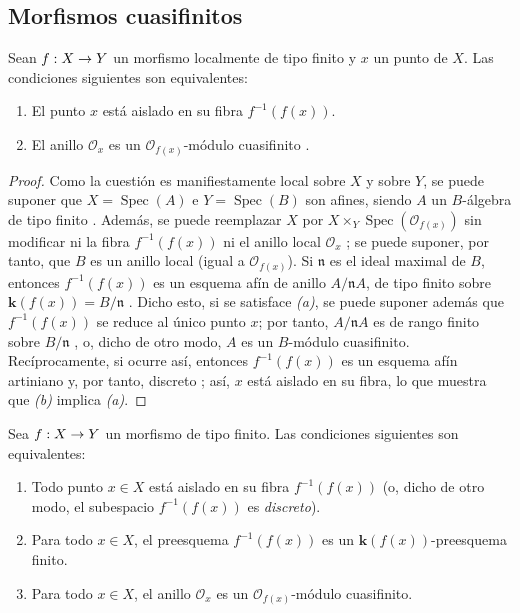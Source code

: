 \documentclass[oneside,10pt]{amsart}
\makeatletter
\newcommand{\ega@arrow}[2]{\mathchoice{#1}{#2}{#2}{#2}}
\renewcommand{\to}{\ega@arrow{\longrightarrow}{\rightarrow}}
\newcommand{\oldpage}[2][]{\marginnote{\normalfont\footnotesize\textbf{#1}~|~#2}\ignorespaces}
\let\EGAOriginalLabel\label
\renewcommand{\label}[1]{\phantomsection\EGAOriginalLabel{#1}}
\makeatother
\begin{document}
\subsection{Morfismos cuasifinitos}
\label{subsection:II.6.2-fr}

\begin{proposition}[6.2.1]
\label{II.6.2.1-fr}
Sean $f:X\to Y$ un morfismo localmente de tipo finito y $x$ un punto de $X$.
Las condiciones siguientes son equivalentes:
\oldpage[II]{115}
\begin{enumerate}
  \item[{\rm(a)}] El punto $x$ está aislado en su fibra $f^{-1}(f(x))$.
  \item[{\rm(b)}] El anillo $\mathcal{O}_x$ es un $\mathcal{O}_{f(x)}$-módulo cuasifinito \textup{}.
\end{enumerate}
\end{proposition}

\begin{proof}
Como la cuestión es manifiestamente local sobre $X$ y sobre $Y$, se puede suponer que $X=\operatorname{Spec}(A)$ e $Y=\operatorname{Spec}(B)$ son afines, siendo $A$ un $B$-álgebra de tipo finito .
Además, se puede reemplazar $X$ por $X\times_Y\operatorname{Spec}(\mathcal{O}_{f(x)})$ sin modificar ni la fibra $f^{-1}(f(x))$ ni el anillo local $\mathcal{O}_x$ ;
se puede suponer, por tanto, que $B$ es un anillo local (igual a $\mathcal{O}_{f(x)}$).
Si $\mathfrak{n}$ es el ideal maximal de $B$, entonces $f^{-1}(f(x))$ es un esquema afín de anillo $A/\mathfrak{n}A$, de tipo finito sobre $\boldsymbol{k}(f(x))=B/\mathfrak{n}$ .
Dicho esto, si se satisface \emph{(a)}, se puede suponer además que $f^{-1}(f(x))$ se reduce al único punto $x$;
por tanto, $A/\mathfrak{n}A$ es de rango finito sobre $B/\mathfrak{n}$ , o, dicho de otro modo, $A$ es un $B$-módulo cuasifinito.
Recíprocamente, si ocurre así, entonces $f^{-1}(f(x))$ es un esquema afín artiniano y, por tanto, discreto ;
así, $x$ está aislado en su fibra, lo que muestra que \emph{(b)} implica \emph{(a)}.
\end{proof}

\begin{corollary}[6.2.2]
\label{II.6.2.2-fr}
Sea $f:X\to Y$ un morfismo de tipo finito.
Las condiciones siguientes son equivalentes:
\begin{enumerate}
  \item[{\rm(a)}] Todo punto $x\in X$ está aislado en su fibra $f^{-1}(f(x))$ \textup{(o, dicho de otro modo, el subespacio $f^{-1}(f(x))$ es \emph{discreto})}.
  \item[{\rm(b)}] Para todo $x\in X$, el preesquema $f^{-1}(f(x))$ es un $\boldsymbol{k}(f(x))$-preesquema finito.
  \item[{\rm(c)}] Para todo $x\in X$, el anillo $\mathcal{O}_x$ es un $\mathcal{O}_{f(x)}$-módulo cuasifinito.
\end{enumerate}
\end{corollary}
\end{document}
